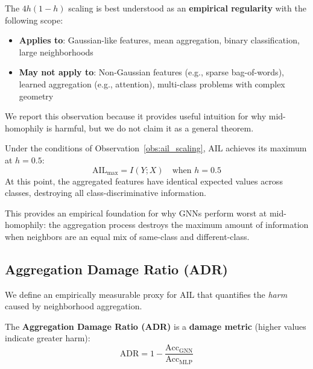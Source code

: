 \begin{remark}
\label{rem:ail_scope}
The $4h(1-h)$ scaling is best understood as an \textbf{empirical regularity} with the following scope:
\begin{itemize}
    \item \textbf{Applies to}: Gaussian-like features, mean aggregation, binary classification, large neighborhoods
    \item \textbf{May not apply to}: Non-Gaussian features (e.g., sparse bag-of-words), learned aggregation (e.g., attention), multi-class problems with complex geometry
\end{itemize}
We report this observation because it provides useful intuition for why mid-homophily is harmful, but we do not claim it as a general theorem.
\end{remark}

\begin{corollary}[Maximum Damage at $h = 0.5$]
\label{cor:max_damage}
Under the conditions of Observation~\ref{obs:ail_scaling}, AIL achieves its maximum at $h = 0.5$:
\begin{equation}
    \text{AIL}_{\max} = I(Y;X) \quad \text{when } h = 0.5
\end{equation}
At this point, the aggregated features have identical expected values across classes, destroying all class-discriminative information.
\end{corollary}

This provides an empirical foundation for why GNNs perform worst at mid-homophily: the aggregation process destroys the maximum amount of information when neighbors are an equal mix of same-class and different-class.

\subsection{Aggregation Damage Ratio (ADR)}

We define an empirically measurable proxy for AIL that quantifies the \textit{harm} caused by neighborhood aggregation.

\begin{definition}
\label{def:adr_theory}
The \textbf{Aggregation Damage Ratio (ADR)} is a \textbf{damage metric} (higher values indicate greater harm):
\begin{equation}
    \text{ADR} = 1 - \frac{\text{Acc}_{\text{GNN}}}{\text{Acc}_{\text{MLP}}}
\end{equation}
\end{definition}

